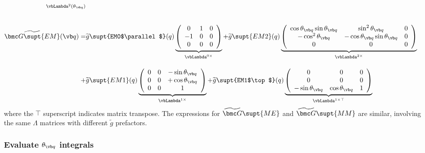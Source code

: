\documentclass[letterpaper]{article}
\renewcommand{\wt}{\widetilde}
\begin{document}
\begin{align*}
{               }_{\vbLambda^{2}(\theta_{\vb q})}
\\[20pt]
 \wt{\bmc G\supt{EM}}(\vb q)
 = &\wt g\supt{EM0$\parallel$}(q)
    \underbrace{ \left(\begin{array}{ccc}
                       0 & 1 & 0 \\ 
                      -1 & 0 & 0 \\ 
                       0 & 0 & 0 
                 \end{array}\right)
               }_{\vbLambda^{0\times}}
  +\wt g\supt{EM2}(q)
   \underbrace{
   \left(\begin{array}{ccc}
    \cos\theta_{\vb q} \sin\theta_{\vb q} & \sin^2\theta_{\vb q} & 0 \\
    -\cos^2\theta_{\vb q} & -\cos\theta_{\vb q} \sin\theta_{\vb q} & 0 \\
    0                     & 0                    & 0 
   \end{array}\right)
              }_{\vbLambda^{2\times}}
\\[10pt]
  + &\wt g\supt{EM1}(q)
   \underbrace{
    \left(\begin{array}{ccc}
    0 & 0 & -\sin\theta_{\vb q} \\
    0 & 0 & +\cos\theta_{\vb q} \\
    0 & 0 & 1
   \end{array}\right)
              }_{\vbLambda^{1\times}}
  + \wt g\supt{EM1$\top$}(q)
   \underbrace{
    \left(\begin{array}{ccc}
    0 & 0 & 0 \\
    0 & 0 & 0 \\
   -\sin\theta_{\vb q} & \cos\theta_{\vb q} & 1
   \end{array}\right)
              }_{\vbLambda^{1\times\top}}
\end{align*}
where the $\top$ superscript indicates matrix transpose.
The expressions for $\wt{\bmc G}\supt{ME}$ and $\wt{\bmc G}\supt{MM}$
are similar, involving the same $\Lambda$ matrices with different
$\wt{g}$ prefactors.

\subsubsection{Evaluate $\theta_{\vb q}$ integrals}
\label{qThetaIntegral}
\end{document}
